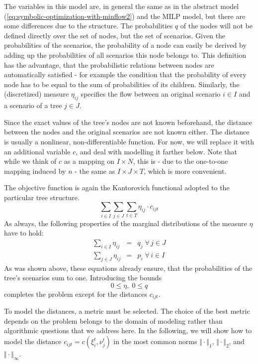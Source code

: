 \documentclass[a4paper, 12pt] {article}
\begin{document}
The variables in this model are, in general the same as in the abstract model (\ref{eq:symbolic-optimization-with-minflow2}) and the MILP model, but there are some differences due to the structure. The probabilities $q$ of the nodes will not be defined directly over the set of nodes, but the set of scenarios. Given the probabilities of the scenarios, the probability of a node can easily be derived by adding up the probabilities of all scenarios this node belongs to. This definition has the advantage, that the probabilistic relations between nodes are automatically satisfied - for example the condition that the probability of every node has to be equal to the sum of probabilities of its children.  Similarly, the (discretized) measure $\eta_{ij}$ specifies the flow between an original scenario $i \in I$ and a scenario of a tree $j \in J$.

Since the exact values of the tree's nodes are not known beforehand, the distance between the nodes and the original scenarios are not known either. The distance is usually a nonlinear, non-differentiable function. For now, we will replace it with an additional variable $c$, and deal with modelling it farther below. Note that while we think of $c$ as a mapping on $I\times N$, this is - due to the one-to-one mapping induced by $n$ - the same as $I\times J\times T$, which is more convenient.

The objective function is again the Kantorovich functional adopted to the particular tree structure.
\begin{equation}
  \label{eq:NLP-derivation-objective}
  \sum_{i\in I}\sum_{j\in J}\sum_{t\in T} \eta_{ij}\cdot c_{ijt}
\end{equation}
As always, the following properties of the marginal distributions of the measure $\eta$ have to hold:
\begin{eqnarray}
  \label{eq:eta-nlp-marginal-q}
  \sum_{i\in I}\eta_{ij} &=& q_j \;\forall\, j\in J\\
  \label{eq:eta-nlp-marginal-p}
  \sum_{j\in J}\eta_{ij} &=& p_i \;\forall\, i\in I
\end{eqnarray}
As was shown above, these equations already ensure, that the probabilities of the tree's scenarios sum to one. Introducing the bounds
\begin{equation}
  \label{eq:bounds-nlp-q-eta}
  0 \leq \eta,\; 0\leq q
\end{equation}
completes the problem except for the distances $c_{ijt}$.

To model the distances, a metric must be selected. The choice of the best metric depends on the problem belongs to the domain of modeling rather than algorithmic questions that we address here. In the following, we will show how to model the distance $c_{ijt}=c(\xi_i^t,\nu_j^t)$ in the most common norms $\Vert\cdot\Vert_1$, $\Vert\cdot\Vert_2$, and $\Vert\cdot\Vert_\infty$.
%
\end{document}
